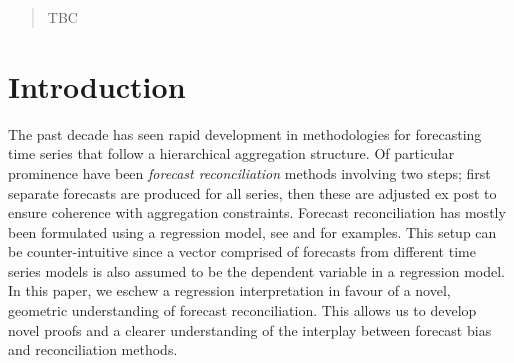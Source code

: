 \documentclass[12pt]{article}
\theoremstyle{definition}
\theoremstyle{property}
\begin{document}
	\bigskip
	
	
	\begin{abstract} TBC
	\end{abstract}
	
	
	\newpage
	
	\section{Introduction}\label{sec:intro}
	
	The past decade has seen rapid development in methodologies for forecasting time series that follow a hierarchical aggregation structure.  Of particular prominence have been {\em forecast reconciliation} methods involving two steps; first separate forecasts are produced for all series, then these are adjusted ex post to ensure coherence with aggregation constraints.  Forecast reconciliation has mostly been formulated using a regression model, see \cite{Hyndman2011} and \cite{WicEtAl2019} for examples.  This setup can be counter-intuitive since a vector comprised of forecasts from different time series models is also assumed to be the dependent variable in a regression model.  In this paper, we eschew a regression interpretation in favour of a novel, geometric understanding of forecast reconciliation.  This allows us to develop novel proofs and a clearer understanding of the interplay between forecast bias and reconciliation methods.
	
\end{document}
